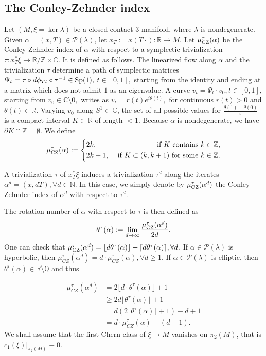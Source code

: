 \documentclass{amsart}
\newcommand{\C}{\mathbb{C}}
\newcommand{\R}{\mathbb{R}}
\newcommand{\Z}{\mathbb{Z}}
\newcommand{\Q}{\mathbb{Q}}
\newcommand{\N}{\mathbb{N}}
\renewcommand{\P}{\mathcal{P}}
\newcommand{\CZ}{\mu_{CZ}^{\tau}}
\begin{document}
\subsection{The Conley-Zehnder index}
Let $(M,\xi = \ker \lambda)$ be a closed contact $3$-manifold, where $\lambda$ is nondegenerate. 
Given $\alpha=(x,T)\in \P(\lambda)$, let $x_T:=x(T\cdot):\R \to M$. Let $\mu_{\rm CZ}^\tau(\alpha)$ be the Conley-Zehnder index of $\alpha$ with respect to a symplectic trivialization $\tau:x_T^*\xi \to \R/ \Z \times \C$. It is defined as follows. The linearized flow along $\alpha$ and the trivialization $\tau$ determine a path of symplectic matrices $\Psi_t = \tau \circ d\phi_{Tt} \circ \tau^{-1}\in {\rm Sp}(1),$ $t\in [0,1],$  starting from the identity and ending at a matrix which does not admit $1$ as an eigenvalue.  A curve $v_t = \Psi_t \cdot v_0,t\in[0,1],$ starting from $v_0\in \C \setminus 0,$ writes as $v_t = r(t) e^{i \theta(t)},$ for continuous $r(t)>0$ and $\theta(t)\in \R.$ Varying $v_0$ along $S^1 \subset \C$, the set of all possible values for $\frac{\theta(1)-\theta(0)}{\pi}$ is a compact interval $K \subset \R$ of length  $<1$. Because $\alpha$ is nondegenerate, we have
$ \partial K \cap \Z = \emptyset.$
We define
$$
\mu_{\rm CZ}^\tau(\alpha) := \left\{\begin{aligned} & 2k, & \mbox{ if }  K \mbox{ contains } k\in \Z, &\\ & 2k+1, & \mbox{ if } K\subset (k,k+1) \mbox{ for some } k\in \Z.  \end{aligned} \right.
$$

A trivialization $\tau$ of $x_T^*\xi$ induces a trivialization $\tau^d$ along the iterates $\alpha^d=(x,dT), \forall d\in \N$. In this case, we  simply denote by $\mu_{\rm CZ}^\tau(\alpha^d)$ the Conley-Zehnder index of $\alpha^d$ with respect to $\tau^d$. 

The rotation number of $\alpha$ with respect to $\tau$  is then defined as
$$
\theta^\tau(\alpha) : =  \lim_{d \to \infty} \frac{\mu_{\rm CZ}^\tau(\alpha^d)}{2d}.
$$
One can check that
$
\mu_{\rm CZ}^\tau(\alpha^d) = \lfloor d \theta^\tau(\alpha) \rfloor + \lceil d\theta^\tau(\alpha) \rceil, \forall d. 
$
If $\alpha\in \P(\lambda)$ is  hyperbolic, then 
$
\mu_{CZ}^{\tau}(\alpha^d)=d\cdot\mu_{CZ}^{\tau}(\alpha), \forall d\geq 1.
$
If $\alpha\in \P(\lambda)$ is elliptic, then $\theta^\tau(\alpha)\in \R \setminus \Q$ and thus

\begin{equation}\label{eq:CZ_ellpitic}
\begin{aligned}
\CZ(\alpha^d) &= 2\lfloor d \cdot \theta^\tau(\alpha) \rfloor + 1 \\
&\geq  2d\lfloor \theta^\tau(\alpha) \rfloor + 1 \\
&= d\left(2\lfloor \theta^\tau(\alpha) \rfloor + 1\right)-d+1 \\
&= d \cdot \CZ(\alpha)-(d-1).
\end{aligned}
\end{equation}
We shall assume that the first Chern class of $\xi \to M$ vanishes on $\pi_2(M)$, that is 
$
c_1(\xi)|_{\pi_2(M)} \equiv 0.$
\end{document}

